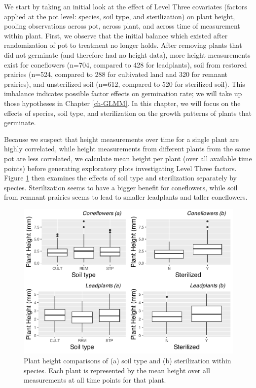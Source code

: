 \documentclass[
]{krantz}
\begin{document}
We start by taking an initial look at the effect of Level Three covariates (factors applied at the pot level: species, soil type, and sterilization) on plant height, pooling observations across pot, across plant, and across time of measurement within plant. First, we observe that the initial balance which existed after randomization of pot to treatment no longer holds. After removing plants that did not germinate (and therefore had no height data), more height measurements exist for coneflowers (n=704, compared to 428 for leadplants), soil from restored prairies (n=524, compared to 288 for cultivated land and 320 for remnant prairies), and unsterilized soil (n=612, compared to 520 for sterilized soil). This imbalance indicates possible factor effects on germination rate; we will take up those hypotheses in Chapter \ref{ch-GLMM}. In this chapter, we will focus on the effects of species, soil type, and sterilization on the growth patterns of plants that germinate.

Because we suspect that height measurements over time for a single plant are highly correlated, while height measurements from different plants from the same pot are less correlated, we calculate mean height per plant (over all available time points) before generating exploratory plots investigating Level Three factors. Figure \ref{fig:boxbyspec} then examines the effects of soil type and sterilization separately by species. Sterilization seems to have a bigger benefit for coneflowers, while soil from remnant prairies seems to lead to smaller leadplants and taller coneflowers.

\begin{figure}

{\centering \includegraphics[width=0.6\linewidth]{bookdown-BeyondMLR_files/figure-latex/boxbyspec-1} 

}

\caption{Plant height comparisons of (a) soil type and (b) sterilization within species.  Each plant is represented by the mean height over all measurements at all time points for that plant.}\label{fig:boxbyspec}
\end{figure}
\end{document}
